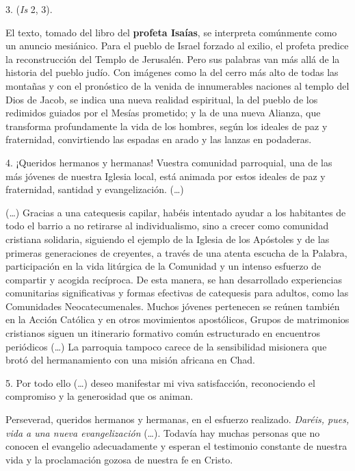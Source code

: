 \begin{body}
					3.  (\emph{Is} 2, 3). 
					
					El texto, tomado del libro del \textbf{profeta Isaías}, se interpreta comúnmente como un anuncio mesiánico. Para el pueblo de Israel forzado al exilio, el profeta predice la reconstrucción del Templo de Jerusalén. Pero sus palabras van más allá de la historia del pueblo judío. Con imágenes como la del cerro más alto de todas las montañas y con el pronóstico de la venida de innumerables naciones al templo del Dios de Jacob, se indica una nueva realidad espiritual, la del pueblo de los redimidos guiados por el Mesías prometido; y la de una nueva Alianza, que transforma profundamente la vida de los hombres, según los ideales de paz y fraternidad, convirtiendo las espadas en arado y las lanzas en podaderas. 
					
					4. ¡Queridos hermanos y hermanas! Vuestra comunidad parroquial, una de las más jóvenes de nuestra Iglesia local, está animada por estos ideales de paz y fraternidad, santidad y evangelización. (\ldots{}) 
					
					(\ldots{}) Gracias a una catequesis capilar, habéis intentado ayudar a los habitantes de todo el barrio a no retirarse al individualismo, sino a crecer como comunidad cristiana solidaria, siguiendo el ejemplo de la Iglesia de los Apóstoles y de las primeras generaciones de creyentes, a través de una atenta escucha de la Palabra, participación en la vida litúrgica de la Comunidad y un intenso esfuerzo de compartir y acogida recíproca. De esta manera, se han desarrollado experiencias comunitarias significativas y formas efectivas de catequesis para adultos, como las Comunidades Neocatecumenales. Muchos jóvenes pertenecen se reúnen también en la Acción Católica y en otros movimientos apostólicos, Grupos de matrimonios cristianos siguen un itinerario formativo común estructurado en encuentros periódicos (\ldots{}) La parroquia tampoco carece de la sensibilidad misionera que brotó del hermanamiento con una misión africana en Chad. 
					
					5. Por todo ello (\ldots{}) deseo manifestar mi viva satisfacción, reconociendo el compromiso y la generosidad que os animan. 
					
					Perseverad, queridos hermanos y hermanas, en el esfuerzo realizado. \emph{Daréis, pues, vida a una nueva evangelización} (\ldots{}). Todavía hay muchas personas que no conocen el evangelio adecuadamente y esperan el testimonio constante de nuestra vida y la proclamación gozosa de nuestra fe en Cristo. 
					

\end{body}
